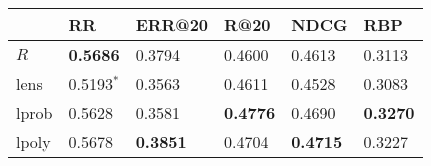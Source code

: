 \begin{tabular}{llllll}
\toprule
{} &               RR &           ERR@20 &             R@20 &             NDCG &              RBP \\
\midrule
$R$   &  \textbf{0.5686} &           0.3794 &           0.4600 &           0.4613 &           0.3113 \\
lens  &     0.5193$^{*}$ &           0.3563 &           0.4611 &           0.4528 &           0.3083 \\
lprob &           0.5628 &           0.3581 &  \textbf{0.4776} &           0.4690 &  \textbf{0.3270} \\
lpoly &           0.5678 &  \textbf{0.3851} &           0.4704 &  \textbf{0.4715} &           0.3227 \\
\bottomrule
\end{tabular}
